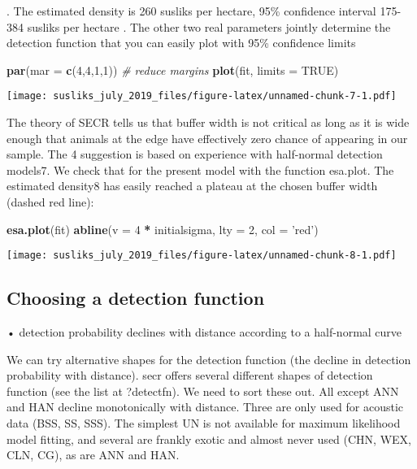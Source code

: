 \documentclass[]{article}
\newenvironment{Shaded}{\begin{snugshade}}{\end{snugshade}}
\newcommand{\CommentTok}[1]{\textcolor[rgb]{0.56,0.35,0.01}{\textit{#1}}}
\newcommand{\DataTypeTok}[1]{\textcolor[rgb]{0.13,0.29,0.53}{#1}}
\newcommand{\DecValTok}[1]{\textcolor[rgb]{0.00,0.00,0.81}{#1}}
\newcommand{\KeywordTok}[1]{\textcolor[rgb]{0.13,0.29,0.53}{\textbf{#1}}}
\newcommand{\NormalTok}[1]{#1}
\newcommand{\OperatorTok}[1]{\textcolor[rgb]{0.81,0.36,0.00}{\textbf{#1}}}
\newcommand{\OtherTok}[1]{\textcolor[rgb]{0.56,0.35,0.01}{#1}}
\newcommand{\StringTok}[1]{\textcolor[rgb]{0.31,0.60,0.02}{#1}}
\begin{document}
. The estimated density is 260 susliks per hectare, 95\% confidence
interval 175-384 susliks per hectare . The other two real parameters
jointly determine the detection function that you can easily plot with
95\% confidence limits

\begin{Shaded}
\begin{Highlighting}[]
\KeywordTok{par}\NormalTok{(}\DataTypeTok{mar =} \KeywordTok{c}\NormalTok{(}\DecValTok{4}\NormalTok{,}\DecValTok{4}\NormalTok{,}\DecValTok{1}\NormalTok{,}\DecValTok{1}\NormalTok{)) }\CommentTok{# reduce margins}
\KeywordTok{plot}\NormalTok{(fit, }\DataTypeTok{limits =} \OtherTok{TRUE}\NormalTok{)}
\end{Highlighting}
\end{Shaded}

\texttt{[image: susliks\_july\_2019\_files/figure-latex/unnamed-chunk-7-1.pdf]}

The theory of SECR tells us that buffer width is not critical as long as
it is wide enough that animals at the edge have effectively zero chance
of appearing in our sample. The 4 suggestion is based on experience with
half-normal detection models7. We check that for the present model with
the function esa.plot. The estimated density8 has easily reached a
plateau at the chosen buffer width (dashed red line):

\begin{Shaded}
\begin{Highlighting}[]
\KeywordTok{esa.plot}\NormalTok{(fit)}
\KeywordTok{abline}\NormalTok{(}\DataTypeTok{v =} \DecValTok{4} \OperatorTok{*}\StringTok{ }\NormalTok{initialsigma, }\DataTypeTok{lty =} \DecValTok{2}\NormalTok{, }\DataTypeTok{col =} \StringTok{'red'}\NormalTok{)}
\end{Highlighting}
\end{Shaded}

\texttt{[image: susliks\_july\_2019\_files/figure-latex/unnamed-chunk-8-1.pdf]}

\hypertarget{choosing-a-detection-function}{%
\subsection{Choosing a detection
function}\label{choosing-a-detection-function}}

• detection probability declines with distance according to a
half-normal curve

We can try alternative shapes for the detection function (the decline in
detection probability with distance). secr offers several different
shapes of detection function (see the list at ?detectfn). We need to
sort these out. All except ANN and HAN decline monotonically with
distance. Three are only used for acoustic data (BSS, SS, SSS). The
simplest UN is not available for maximum likelihood model fitting, and
several are frankly exotic and almost never used (CHN, WEX, CLN, CG), as
are ANN and HAN.
\end{document}
